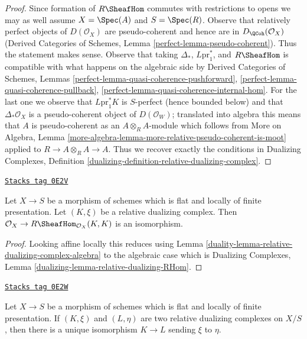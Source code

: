 \begin{proof}
Since formation of $R\SheafHom$ commutes with restrictions to
opens we may as well assume $X = \Spec(A)$ and $S = \Spec(R)$.
Observe that relatively perfect objects of $D(\mathcal{O}_X)$
are pseudo-coherent and hence are in $D_\QCoh(\mathcal{O}_X)$
(Derived Categories of Schemes, Lemma \ref{perfect-lemma-pseudo-coherent}).
Thus the statement makes sense.
Observe that taking $\Delta_*$, $L\text{pr}_1^*$, and
$R\SheafHom$ is compatible with what happens on the algebraic
side by
Derived Categories of Schemes,
Lemmas \ref{perfect-lemma-quasi-coherence-pushforward},
\ref{perfect-lemma-quasi-coherence-pullback},
\ref{perfect-lemma-quasi-coherence-internal-hom}.
For the last one we observe that $L\text{pr}_1^*K$
is $S$-perfect (hence bounded below) and that $\Delta_*\mathcal{O}_X$
is a pseudo-coherent object of $D(\mathcal{O}_W)$;
translated into algebra this means that $A$ is pseudo-coherent
as an $A \otimes_R A$-module which follows from
More on Algebra, Lemma
\ref{more-algebra-lemma-more-relative-pseudo-coherent-is-moot}
applied to $R \to A \otimes_R A \to A$.
Thus we recover exactly the conditions in
Dualizing Complexes, Definition
\ref{dualizing-definition-relative-dualizing-complex}.
\end{proof}

\begin{lemma}
\label{duality-lemma-relative-dualizing-RHom}
\href{https://stacks.math.columbia.edu/tag/0E2V}{\texttt{Stacks tag 0E2V}}

Let $X \to S$ be a morphism of schemes which is flat and
locally of finite presentation. Let $(K, \xi)$ be a relative
dualizing complex. Then
$\mathcal{O}_X \to R\SheafHom_{\mathcal{O}_X}(K, K)$
is an isomorphism.
\end{lemma}

\begin{proof}

Looking affine locally this reduces using
Lemma \ref{duality-lemma-relative-dualizing-complex-algebra}
to the algebraic case which is
Dualizing Complexes, Lemma \ref{dualizing-lemma-relative-dualizing-RHom}.
\end{proof}

\begin{lemma}
\label{duality-lemma-uniqueness-relative-dualizing}
\href{https://stacks.math.columbia.edu/tag/0E2W}{\texttt{Stacks tag 0E2W}}

Let $X \to S$ be a morphism of schemes which is flat and
locally of finite presentation. If $(K, \xi)$ and $(L, \eta)$
are two relative dualizing complexes on $X/S$, then there is a unique
isomorphism $K \to L$ sending $\xi$ to $\eta$.
\end{lemma}

